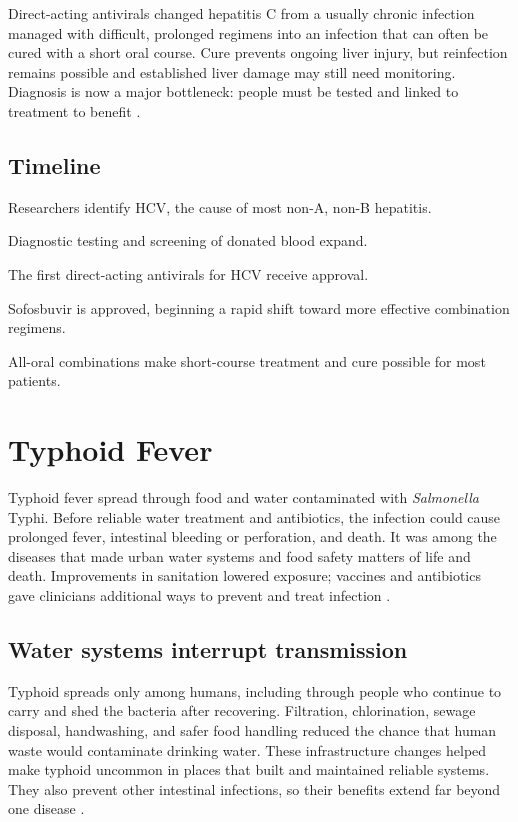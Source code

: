 \documentclass[12pt,oneside]{book}
\begin{document}
Direct-acting antivirals changed hepatitis C from a usually chronic infection
managed with difficult, prolonged regimens into an infection that can often be
cured with a short oral course. Cure prevents ongoing liver injury, but
reinfection remains possible and established liver damage may still need
monitoring. Diagnosis is now a major bottleneck: people must be tested and
linked to treatment to benefit \cite{niddkHCVDiscovery,cdcHCVClinicalCare}.

\section*{Timeline}
\begin{description}[leftmargin=2.3cm,style=nextline]
  \item[1989] Researchers identify HCV, the cause of most non-A, non-B hepatitis.
  \item[1990s] Diagnostic testing and screening of donated blood expand.
  \item[2011] The first direct-acting antivirals for HCV receive approval.
  \item[2013] Sofosbuvir is approved, beginning a rapid shift toward more effective combination regimens.
  \item[2010s onward] All-oral combinations make short-course treatment and cure possible for most patients.
\end{description}

\chapter[Typhoid Fever]{Typhoid Fever}

Typhoid fever spread through food and water contaminated with \emph{Salmonella}
Typhi. Before reliable water treatment and antibiotics, the infection could
cause prolonged fever, intestinal bleeding or perforation, and death. It was
among the diseases that made urban water systems and food safety matters of
life and death. Improvements in sanitation lowered exposure; vaccines and
antibiotics gave clinicians additional ways to prevent and treat infection
\cite{whoTyphoid2023}.

\section{Water systems interrupt transmission}
Typhoid spreads only among humans, including through people who continue to
carry and shed the bacteria after recovering. Filtration, chlorination,
sewage disposal, handwashing, and safer food handling reduced the chance that
human waste would contaminate drinking water. These infrastructure changes
helped make typhoid uncommon in places that built and maintained reliable
systems. They also prevent other intestinal infections, so their benefits
extend far beyond one disease \cite{whoTyphoid2023}.
\end{document}
